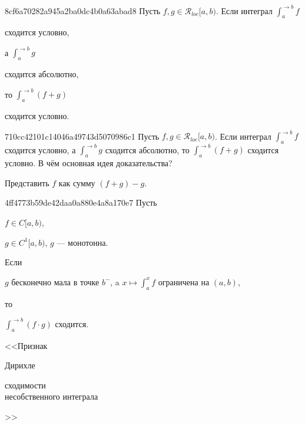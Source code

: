 \begin{note}{8cf6a70282a945a2ba0dc4b0a63abad8}
    Пусть \({ f, g \in \mathcal R_{loc}[a, b) }\).
    Если интеграл \({ \int_{a}^{\to b} f }\) \begin{icloze}{2}сходится условно,\end{icloze} а \({ \int_{a}^{\to b} g }\) \begin{icloze}{2}сходится абсолютно,\end{icloze} то \({ \int_{a}^{\to b} (f + g) }\) \begin{icloze}{1}сходится условно.\end{icloze}
\end{note}

\begin{note}{710cc42101c14046a49743d5070986c1}
    Пусть \({ f, g \in \mathcal R_{loc}[a, b) }\).
    Если интеграл \({ \int_{a}^{\to b} f }\) сходится условно, а \({ \int_{a}^{\to b} g }\) сходится абсолютно, то \({ \int_{a}^{\to b} (f + g) }\) сходится условно.
    В чём основная идея доказательства?

    \begin{cloze}{1}
        Представить \({ f }\) как сумму \({ (f + g) - g }\).
    \end{cloze}
\end{note}

\begin{note}{4ff4773b59de42daa0a880e4a8a170e7}
    Пусть \begin{icloze}{4}\({ f \in C[a, b) }\),\end{icloze} \begin{icloze}{3}\({ g \in C^{1}[a, b) }\),\: \({ g }\) --- монотонна.\end{icloze} Если
    \begin{icloze}{1}
        \({ g }\) бесконечно мала в точке \({ b^{-} }\), a
        \({ x \mapsto \int_{a}^{x} f }\) ограничена на \({ (a, b) }\),
    \end{icloze}
    то \begin{icloze}{2}\({ \int_{a}^{\to b} (f \cdot g) }\) сходится.\end{icloze}

    \begin{center}
        \tiny
        <<Признак \begin{icloze}{5}Дирихле\end{icloze} \begin{icloze}{2}сходимости \\\phantom{<<}несобственного интеграла\end{icloze}>>
    \end{center}
\end{note}

